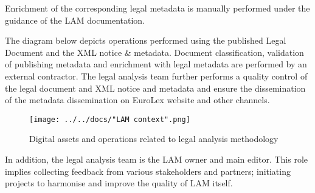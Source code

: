 Enrichment of the corresponding legal metadata is manually performed
under the guidance of the LAM documentation.

The diagram below depicts operations performed using the published Legal
Document and the XML notice \& metadata. Document classification,
validation of publishing metadata and enrichment with legal metadata are
performed by an external contractor. The legal analysis team further
performs a quality control of the legal document and XML notice and
metadata and ensure the dissemination of the metadata dissemination on
EuroLex website and other channels.

\begin{figure}[!ht]
\centering
\texttt{[image: ../../docs/"LAM context".png]}
\caption{Digital assets and operations related to legal
analysis methodology}
\end{figure}

In addition, the legal analysis team is the LAM owner and main editor.
This role implies collecting feedback from various stakeholders and
partners; initiating projects to harmonise and improve the quality of
LAM itself.

